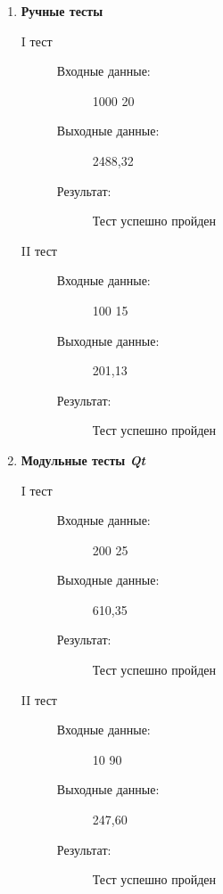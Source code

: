 \documentclass[12pt,a4paper]{report}
\begin{document}
\begin{enumerate}
\item \textbf{Ручные тесты}

\begin{description}
\item[I тест]
\hspace{\parindent}
\begin{flushleft}
\begin{description}
\item[Входные данные:] 1000 20
\item[Выходные данные:] 2488,32
\item[Результат:] Тест успешно пройден
\end{description}
\end{flushleft}
\end{description}

\begin{description}
\item[II тест]
\hspace{\parindent}
\begin{flushleft}
\begin{description}
\item[Входные данные:] 100 15
\item[Выходные данные:] 201,13
\item[Результат:] Тест успешно пройден
\end{description}
\end{flushleft}
\end{description}

\item \textbf{Модульные тесты \textit{Qt}}
\begin{description}
\item[I тест]
\hspace{\parindent}
\begin{flushleft}
\begin{description}
\item[Входные данные:] 200 25
\item[Выходные данные:] 610,35
\item[Результат:] Тест успешно пройден
\end{description}
\end{flushleft}
\end{description}

\begin{description}
\item[II тест]
\hspace{\parindent}
\begin{flushleft}
\begin{description}
\item[Входные данные:] 10 90
\item[Выходные данные:] 247,60
\item[Результат:] Тест успешно пройден
\end{description}
\end{flushleft}
\end{description}


\end{enumerate}
\end{document}
